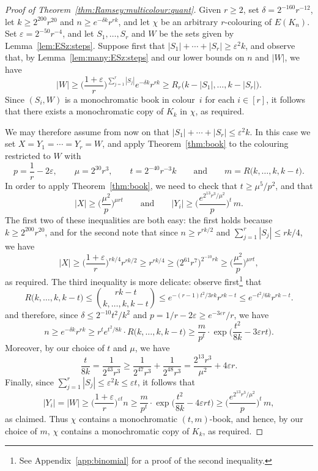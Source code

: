 \documentclass[12pt,reqno]{amsart}
\theoremstyle{definition}
\theoremstyle{remark}
\newcommand\eps{\varepsilon}
\renewcommand{\le}{\leqslant}
\renewcommand{\ge}{\geqslant}
\def\eps{\varepsilon}
\begin{document}
\begin{proof}[Proof of Theorem~\ref{thm:Ramsey:multicolour:quant}]
Given $r \ge 2$, set $\delta = 2^{-160} r^{-12}$, let $k \ge 2^{200} r^{20}$ and $n \ge e^{-\delta k} r^{rk}$, and let $\chi$ be an arbitrary $r$-colouring of $E(K_n)$. Set $\eps = 2^{-50} r^{-4}$, and let $S_1,\ldots,S_r$ and $W$ be the sets given by Lemma~\ref{lem:ESz:steps}. Suppose first that $|S_1| + \cdots + |S_r| \ge \eps^2 k$, and observe that, by Lemma~\ref{lem:many:ESz:steps} and our lower bounds on $n$ and $|W|$, we have 
$$|W| \ge \bigg( \frac{1+\eps}{r} \bigg)^{\sum_{j = 1}^r |S_j|} e^{-\delta k} r^{rk} \ge R_r\big( k - |S_1|, \ldots, k - |S_r| \big).$$ 
Since $(S_i,W)$ is a monochromatic book in colour~$i$ for each $i \in [r]$, it follows that there exists a monochromatic copy of $K_k$ in $\chi$, as required.

We may therefore assume from now on that  $|S_1| + \cdots + |S_r| \le \eps^2 k$. In this case we set $X = Y_1 = \cdots = Y_r = W$, and apply Theorem~\ref{thm:book} to the colouring restricted to $W$ with 
$$p = \frac{1}{r} - 2\eps, \qquad \mu = 2^{30} r^3, \qquad t = 2^{-40} r^{-3} k \qquad \text{and} \qquad m = R\big( k, \ldots, k, k - t \big).$$
In order to apply Theorem~\ref{thm:book}, we need to check that $t \ge \mu^5 / p^2$, and that
$$|X| \ge \bigg( \frac{\mu^2}{p} \bigg)^{\mu r t} \qquad \text{and} \qquad |Y_i| \ge \bigg( \frac{e^{2^{13} r^3 / \mu^2}}{p} \bigg)^t \, m.$$
The first two of these inequalities are both easy: the first holds because $k \ge 2^{200} r^{20}$, and for the second note that since $n \ge r^{rk/2}$ and $\sum_{j = 1}^r |S_j| \le rk/4$, we have
$$|X| \ge \bigg( \frac{1+\eps}{r} \bigg)^{rk/4} r^{rk/2} \ge r^{rk/4} \ge \big( 2^{61} r^7 \big)^{2^{-10} r k} \ge \bigg( \frac{\mu^2}{p} \bigg)^{\mu r t},$$
as required. The third inequality is more delicate: observe first\footnote{See Appendix~\ref{app:binomial} for a proof of the second inequality.} that 
$$R\big( k, \ldots, k, k-t \big) \le \binom{rk-t}{k,\dots,k,k-t} \le e^{-(r-1)t^2/3rk} r^{rk-t} \le e^{-t^2/6k} r^{rk-t}.$$
and therefore, since $\delta \le 2^{-10} t^2/k^2$ and $p = 1/r - 2\eps \ge e^{-3\eps r} / r$, we have 
$$n \ge e^{-\delta k} r^{rk} \ge r^t e^{t^2/8k} \cdot R\big( k, \ldots, k, k-t \big) \ge \frac{m}{p^t} \cdot \exp\bigg( \frac{t^2}{8k} - 3\eps r t \bigg).$$
Moreover, by our choice of $t$ and $\mu$, we have 
$$\frac{t}{8k} = \frac{1}{2^{43} r^3} \ge \frac{1}{2^{47}r^3} + \frac{1}{2^{48}r^3} = \frac{2^{13} r^3}{\mu^2} + 4\eps r.$$
Finally, since $\sum_{j = 1}^r |S_j| \le \eps^2 k \le \eps t$, it follows that
$$|Y_i| = |W| \ge \bigg( \frac{1+\eps}{r} \bigg)^{\eps t} n \ge \frac{m}{p^t} \cdot \exp\bigg( \frac{t^2}{8k} - 4\eps r t \bigg) \ge \bigg( \frac{e^{2^{13} r^3 / \mu^2}}{p} \bigg)^t \, m,$$
as claimed. Thus $\chi$ contains a monochromatic $(t,m)$-book, and hence, by our choice of $m$, $\chi$ contains a monochromatic copy of $K_k$, as required.
\end{proof}
\end{document}
